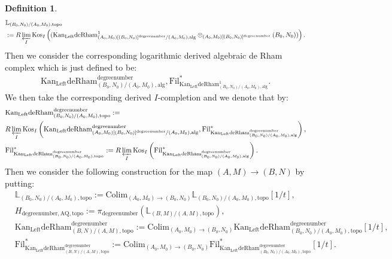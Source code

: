 \documentclass[11pt]{book}
\theoremstyle{definition}
\newtheorem{definition}[theorem]{Definition}
\numberwithin{equation}{section}
\begin{document}
\begin{definition}
\begin{align}
&\mathbb{L}_{(B_0,N_0)/(A_0,M_0),\mathrm{topo}}\\
&:=R\varprojlim_I\mathrm{Kos}_I	\left((\mathrm{Kan}_\mathrm{Left}\mathrm{deRham}^1_{(A_0,M_0)[(B_0,N_0)]^\text{degreenumber}/(A_0,M_0),\mathrm{alg}}\otimes_{(A_0,M_0)[(B_0,N_0)]^\text{degreenumber}} (B_0,N_0))\right).
\end{align}
Then we consider the corresponding logarithmic derived algebraic de Rham complex which is just defined to be:
\begin{align}
\mathrm{Kan}_\mathrm{Left}\mathrm{deRham}^\text{degreenumber}_{(B_0,N_0)/(A_0,M_0),\mathrm{alg}},\mathrm{Fil}^*_{\mathrm{Kan}_\mathrm{Left}\mathrm{deRham}^1_{(B_0,N_0)/(A_0,M_0),\mathrm{alg}}}.	
\end{align}
We then take the corresponding derived $I$-completion and we denote that by:
\begin{align}
&\mathrm{Kan}_\mathrm{Left}\mathrm{deRham}^\text{degreenumber}_{(B_0,N_0)/(A_0,M_0),\mathrm{topo}}:=\\
&R\varprojlim_I\mathrm{Kos}_I\left(\mathrm{Kan}_\mathrm{Left}\mathrm{deRham}^\text{degreenumber}_{(A_0,M_0)[(B_0,N_0)]^\text{degreenumber}/(A_0,M_0),\mathrm{alg}},\mathrm{Fil}^*_{\mathrm{Kan}_\mathrm{Left}\mathrm{deRham}^\text{degreenumber}_{(B_0,N_0)/(A_0,M_0),\mathrm{alg}}}\right),\\
&\mathrm{Fil}^*_{\mathrm{Kan}_\mathrm{Left}\mathrm{deRham}^\text{degreenumber}_{(B_0,N_0)/(A_0,M_0),\mathrm{topo}}}:=R\varprojlim_I\mathrm{Kos}_I\left(\mathrm{Fil}^*_{\mathrm{Kan}_\mathrm{Left}\mathrm{deRham}^\text{degreenumber}_{(B_0,N_0)/(A_0,M_0),\mathrm{alg}}}\right).	
\end{align}
Then we consider the following construction for the map $(A,M)\rightarrow (B,N)$ by putting:
\begin{align}
&\mathbb{L}_{(B_0,N_0)/(A_0,M_0),\mathrm{topo}}:= \mathrm{Colim}_{(A_0,M_0)\rightarrow (B_0,N_0)}\mathbb{L}_{(B_0,N_0)/(A_0,M_0),\mathrm{topo}}[1/t],\\
&H_{\text{degreenumber},{\mathrm{AQ}},\mathrm{topo}}:=\pi_\text{degreenumber} (\mathbb{L}_{(B,M)/(A,M),\mathrm{topo}}),	\\
&\mathrm{Kan}_\mathrm{Left}\mathrm{deRham}^\text{degreenumber}_{(B,N)/(A,M),\mathrm{topo}}:=\mathrm{Colim}_{(A_0,M_0)\rightarrow (B_0,N_0)}\mathrm{Kan}_\mathrm{Left}\mathrm{deRham}^\text{degreenumber}_{(B_0,N_0)/(A_0,M_0),\mathrm{topo}}[1/t],\\
&\mathrm{Fil}^*_{\mathrm{Kan}_\mathrm{Left}\mathrm{deRham}^\text{degreenumber}_{(B,N)/(A,M),\mathrm{topo}}}:=\mathrm{Colim}_{(A_0,M_0)\rightarrow (B_0,N_0)}\mathrm{Fil}^*_{\mathrm{Kan}_\mathrm{Left}\mathrm{deRham}^\text{degreenumber}_{(B_0,N_0)/(A_0,M_0),\mathrm{topo}}}[1/t].

\end{align}
\end{definition}
\end{document}
